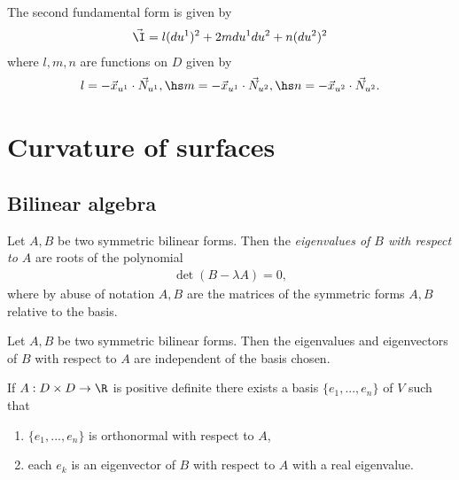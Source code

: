 \documentclass{article}
\begin{document}
\begin{proposition}
    The second fundamental form is given by
    \begin{align*}
        \vec\I = l(du^1)^2 + 2mdu^1du^2+n(du^2)^2
    \end{align*}
    where $l,m,n$ are functions on $D$ given by
    \begin{align*}
        l=-\vec x_{u^1}\cdot\vec N_{u^1}, \hs 
        m=-\vec x_{u^1}\cdot\vec N_{u^2}, \hs 
        n=-\vec x_{u^2}\cdot\vec N_{u^2}.
    \end{align*}
\end{proposition}

\section{Curvature of surfaces}

\subsection{Bilinear algebra}

\begin{definition}
    Let $A,B$ be two symmetric bilinear forms. Then the \emph{eigenvalues of $B$ with respect to $A$} 
    are roots of the polynomial 
    \begin{align*}
        \det(B-\lambda A) = 0,
    \end{align*}
    where by abuse of notation $A,B$ are the matrices of the symmetric forms $A,B$ relative to the 
    basis.
\end{definition}

\begin{lemma}
    Let $A,B$ be two symmetric bilinear forms. Then the eigenvalues and eigenvectors of $B$ with respect 
    to $A$ are independent of the basis chosen.
\end{lemma}

\begin{proposition}
    If $A:D\times D\to\R$ is positive definite there exists a basis $\{e_1, ..., e_n\}$ of $V$ such that
    \begin{enumerate}
        \item $\{e_1,...,e_n\}$ is orthonormal with respect to $A$,
        \item each $e_k$ is an eigenvector of $B$ with respect to $A$ with a real eigenvalue.
    \end{enumerate}
\end{proposition}
\end{document}
